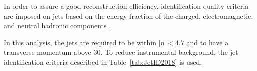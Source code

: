 \label{sec:jet_ID}
In order to assure a good reconstruction efficiency, identification quality criteria are imposed on jets based on
the energy fraction of the charged, electromagnetic, and neutral hadronic components \cite{CMS-PAS-JME-16-003}.

In this analysis, the jets are required to be within $|\eta| < 4.7$ and to have a transverse momentum above 30\GeV.
To reduce instrumental background, the jet identification criteria described in Table~\ref{tab:JetID2018} is used.

\begin{table}
  \caption{Jet identification criteria used in \RunII{} with thresholds used for 2018 data.}
  \label{tab:JetID2018}
\end{table}

